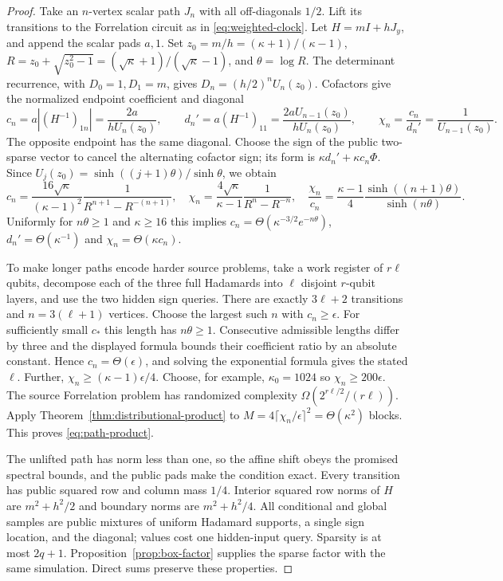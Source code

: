 \begin{proof}
Take an $n$-vertex scalar path $J_n$ with all off-diagonals $1/2$.
Lift its transitions to the Forrelation circuit as in
\eqref{eq:weighted-clock}. Let $H=mI+hJ_y$, and append the scalar
pads $a,1$. Set
$z_0=m/h=(\kappa+1)/(\kappa-1)$,
$R=z_0+\sqrt{z_0^2-1}=(\sqrt\kappa+1)/(\sqrt\kappa-1)$,
and $\theta=\log R$.
The determinant recurrence, with $D_0=1,D_1=m$, gives
$D_n=(h/2)^nU_n(z_0)$.
Cofactors give the normalized endpoint coefficient and diagonal
\begin{equation}\label{eq:path-values}
 c_n=a|(H^{-1})_{1n}|=\frac{2a}{hU_n(z_0)},\qquad
 d_n'=a(H^{-1})_{11}=\frac{2aU_{n-1}(z_0)}{hU_n(z_0)},\qquad
 \chi_n=\frac{c_n}{d_n'}=\frac1{U_{n-1}(z_0)}.
\end{equation}
The opposite endpoint has the same diagonal. Choose the sign of the
public two-sparse vector to cancel the alternating cofactor sign;
its form is $\kappa d_n'+\kappa c_n\Phi$.
Since $U_j(z_0)=\sinh((j+1)\theta)/\sinh\theta$, we obtain
\[
 c_n=\frac{16\sqrt\kappa}{(\kappa-1)^2}
       \frac1{R^{n+1}-R^{-(n+1)}},\quad
 \chi_n=\frac{4\sqrt\kappa}{\kappa-1}
       \frac1{R^n-R^{-n}},\quad
 \frac{\chi_n}{c_n}=\frac{\kappa-1}{4}
       \frac{\sinh((n+1)\theta)}{\sinh(n\theta)}.
\]
Uniformly for $n\theta\geq1$ and $\kappa\geq16$ this implies
$c_n=\Theta(\kappa^{-3/2}e^{-n\theta})$,
$d_n'=\Theta(\kappa^{-1})$ and $\chi_n=\Theta(\kappa c_n)$.

To make longer paths encode harder source problems, take a work register
of $r\ell$ qubits, decompose each of the three full Hadamards into
$\ell$ disjoint $r$-qubit layers, and use the two hidden sign queries.
There are exactly $3\ell+2$ transitions and
$n=3(\ell+1)$ vertices. Choose the largest such $n$ with
$c_n\geq\epsilon$. For sufficiently small $c_*$ this length has
$n\theta\geq1$. Consecutive admissible lengths differ by three and
the displayed formula bounds their coefficient ratio by an absolute
constant. Hence $c_n=\Theta(\epsilon)$, and solving the exponential
formula gives the stated $\ell$. Further,
$\chi_n\geq(\kappa-1)\epsilon/4$.
Choose, for example, $\kappa_0=1024$ so
$\chi_n\geq200\epsilon$. The source Forrelation problem has
randomized complexity $\Omega(2^{r\ell/2}/(r\ell))$.
Apply Theorem~\ref{thm:distributional-product} to
$M=4\lceil\chi_n/\epsilon\rceil^2=\Theta(\kappa^2)$ blocks.
This proves \eqref{eq:path-product}.

The unlifted path has norm less than one, so the affine shift obeys
the promised spectral bounds, and the public pads make the condition
exact. Every transition has public squared row and column mass $1/4$.
Interior squared row norms of $H$ are $m^2+h^2/2$ and boundary
norms are $m^2+h^2/4$. All conditional and global samples are public
mixtures of uniform Hadamard supports, a single sign location, and
the diagonal; values cost one hidden-input query. Sparsity is at most
$2q+1$. Proposition~\ref{prop:box-factor} supplies the sparse factor
with the same simulation. Direct sums preserve these properties.
\end{proof}

